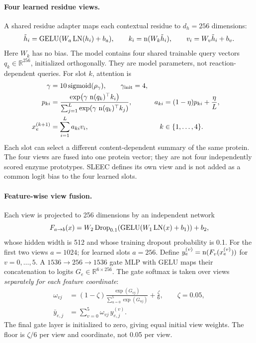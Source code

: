 \paragraph{Four learned residue views.}
A shared residue adapter maps each contextual residue to $d_h=256$ dimensions:
\begin{equation}
  \tilde h_i=\operatorname{GELU}(W_a\operatorname{LN}(h_i)+b_a),\qquad
  k_i=\operatorname{n}(W_k\tilde h_i),\qquad
  v_i=W_v\tilde h_i+b_v.
  \label{eq:v4-residue-adapter}
\end{equation}
Here $W_k$ has no bias. The model contains four shared trainable query vectors
$q_k\in\mathbb{R}^{256}$, initialized orthogonally. They are model parameters,
not reaction-dependent queries. For slot $k$, attention is
\begin{align}
  \gamma &=10\operatorname{sigmoid}(\rho_\gamma),\qquad \gamma_{\mathrm{init}}=4,\\
  p_{ki}&=\frac{\exp\!\left(\gamma\,\operatorname{n}(q_k)^{\top}k_i\right)}
                     {\sum_{j=1}^{L}\exp\!\left(\gamma\,\operatorname{n}(q_k)^{\top}k_j\right)},
  & a_{ki}&=(1-\eta)p_{ki}+\frac{\eta}{L},\\
  x_e^{(k+1)}&=\sum_{i=1}^{L}a_{ki}v_i,
  & k&\in\{1,\ldots,4\}.
  \label{eq:v4-slots}
\end{align}
Each slot can select a different content-dependent summary of the same
protein. The four views are fused into one protein vector; they are not four
independently scored enzyme prototypes. SLEEC defines its own view and is not
added as a common logit bias to the four learned slots.

\paragraph{Feature-wise view fusion.}
Each view is projected to 256 dimensions by an independent network
\begin{equation}
  F_{a\to b}(x)=W_2\operatorname{Drop}_{0.1}\!\left(\operatorname{GELU}(W_1\operatorname{LN}(x)+b_1)\right)+b_2,
  \label{eq:v4-protein-ffn}
\end{equation}
whose hidden width is 512 and whose training dropout probability is 0.1.
For the first two views $a=1024$; for learned slots $a=256$. Define
$y_e^{(v)}=\operatorname{n}(F_v(x_e^{(v)}))$ for $v=0,\ldots,5$.
A $1536\!\to\!256\!\to\!1536$ gate MLP with GELU maps their concatenation
to logits $G_e\in\mathbb{R}^{6\times256}$. The gate softmax is taken over
views \emph{separately for each feature coordinate}:
\begin{align}
  \omega_{vj}
    &=(1-\zeta)\frac{\exp(G_{vj})}{\sum_{u=0}^{5}\exp(G_{uj})}
       +\frac{\zeta}{6},\qquad \zeta=0.05,\\
  \bar y_{e,j}&=\sum_{v=0}^{5}\omega_{vj}\,y_{e,j}^{(v)}.
  \label{eq:v4-view-gate}
\end{align}
The final gate layer is initialized to zero, giving equal initial view
weights. The floor is $\zeta/6$ per view and coordinate, not 0.05 per view.

